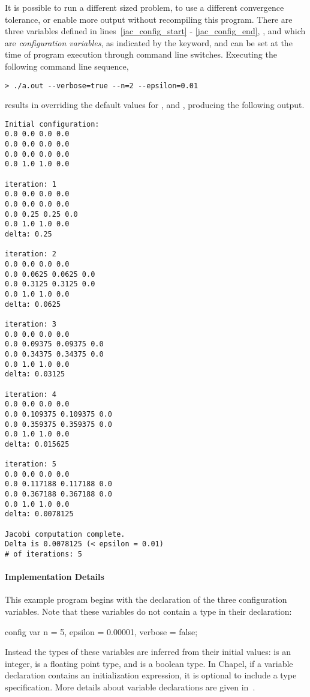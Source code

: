 It is possible to run a different sized problem, to use a different
convergence tolerance, or enable more output without recompiling this
program.  There are three variables defined in lines~\ref{jac_config_start} - 
\ref{jac_config_end}, 
,  and  which are {\em configuration variables},
as indicated by the  keyword, 
and can be set at the time of program execution through command line switches.
Executing the following command line sequence,
{\small
\begin{verbatim}
> ./a.out --verbose=true --n=2 --epsilon=0.01
\end{verbatim}}
results in overriding the default values for ,  and
, producing the following output.
{\small
\begin{verbatim}
Initial configuration:
0.0 0.0 0.0 0.0
0.0 0.0 0.0 0.0
0.0 0.0 0.0 0.0
0.0 1.0 1.0 0.0

iteration: 1
0.0 0.0 0.0 0.0
0.0 0.0 0.0 0.0
0.0 0.25 0.25 0.0
0.0 1.0 1.0 0.0
delta: 0.25

iteration: 2
0.0 0.0 0.0 0.0
0.0 0.0625 0.0625 0.0
0.0 0.3125 0.3125 0.0
0.0 1.0 1.0 0.0
delta: 0.0625

iteration: 3
0.0 0.0 0.0 0.0
0.0 0.09375 0.09375 0.0
0.0 0.34375 0.34375 0.0
0.0 1.0 1.0 0.0
delta: 0.03125

iteration: 4
0.0 0.0 0.0 0.0
0.0 0.109375 0.109375 0.0
0.0 0.359375 0.359375 0.0
0.0 1.0 1.0 0.0
delta: 0.015625

iteration: 5
0.0 0.0 0.0 0.0
0.0 0.117188 0.117188 0.0
0.0 0.367188 0.367188 0.0
0.0 1.0 1.0 0.0
delta: 0.0078125

Jacobi computation complete.
Delta is 0.0078125 (< epsilon = 0.01)
# of iterations: 5
\end{verbatim}}

\paragraph{Implementation Details}
This example program begins with the declaration of the three configuration
variables.  Note that these variables do not contain a type in their declaration: 
\begin{chapel}
config var n = 5,
           epsilon = 0.00001,
           verbose = false;
\end{chapel}
Instead the types of these variables are inferred  
from their initial values:  is an integer,  is a floating point
type, and  is a boolean type.  In Chapel, if a variable declaration
contains an initialization expression, it is optional to include a type specification.
More details about variable declarations are given in~.

